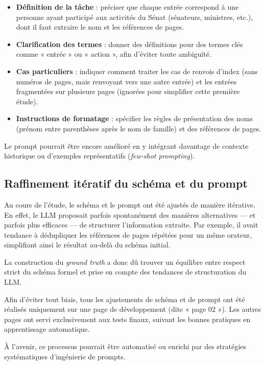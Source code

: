 \begin{itemize}
\item \textbf{Définition de la tâche} : préciser que chaque entrée correspond à une personne ayant participé aux activités du Sénat (sénateurs, ministres, etc.), dont il faut extraire le nom et les références de pages.
\item \textbf{Clarification des termes} : donner des définitions pour des termes clés comme « entrée » ou « action », afin d’éviter toute ambiguïté.
\item \textbf{Cas particuliers} : indiquer comment traiter les cas de renvois d’index (sans numéros de pages, mais renvoyant vers une autre entrée) et les entrées fragmentées sur plusieurs pages (ignorées pour simplifier cette première étude).
\item \textbf{Instructions de formatage} : spécifier les règles de présentation des noms (prénom entre parenthèses après le nom de famille) et des références de pages.

\end{itemize}
Le prompt pourrait être encore amélioré en y intégrant davantage de contexte historique ou d’exemples représentatifs (\emph{few-shot prompting}).

\subsection{Raffinement itératif du schéma et du prompt}

Au cours de l’étude, le schéma et le prompt ont été ajustés de manière itérative. En effet, le LLM proposait parfois spontanément des manières alternatives — et parfois plus efficaces — de structurer l’information extraite. Par exemple, il avait tendance à dédupliquer les références de pages répétées pour un même orateur, simplifiant ainsi le résultat au-delà du schéma initial.

La construction du \emph{ground truth} a donc dû trouver un équilibre entre respect strict du schéma formel et prise en compte des tendances de structuration du LLM.

Afin d’éviter tout biais, tous les ajustements de schéma et de prompt ont été réalisés uniquement sur une page de développement (dite « page 02 »). Les autres pages ont servi exclusivement aux tests finaux, suivant les bonnes pratiques en apprentissage automatique.

À l’avenir, ce processus pourrait être automatisé ou enrichi par des stratégies systématiques d’ingénierie de prompts.

